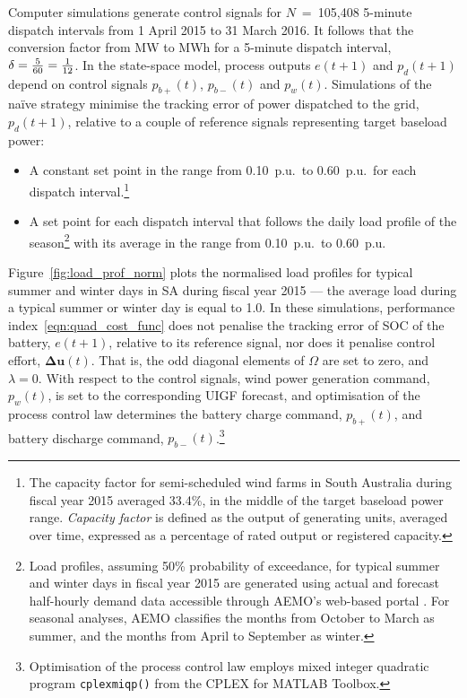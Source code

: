Computer simulations generate control signals for $N$~=~105,408 5-minute dispatch intervals from 1 April 2015 to 31 March 2016.  It follows that the conversion factor from MW to MWh for a 5-minute dispatch interval, $\delta = \tfrac{5}{60} = \tfrac{1}{12}$.  In the state-space model, process outputs $e(t\!+\!1)$ and $p_{d}(t\!+\!1)$ depend on control signals $p_{b+}(t)$, $p_{b-}(t)$ and $p_{w}(t)$.  Simulations of the na\"ive strategy minimise the tracking error of power dispatched to the grid, $p_{d}(t\!+\!1)$, relative to a couple of reference signals representing target baseload power:
\begin{itemize}
	\item  A constant set point in the range from 0.10~p.u.\ to 0.60~p.u.\ for each dispatch interval.\footnote{
The capacity factor for semi-scheduled wind farms in South Australia during fiscal year 2015 averaged 33.4\%, in the middle of the target baseload power range.  \textit{Capacity factor} is defined as the output of generating units, averaged over time,  expressed as a percentage of rated output or registered capacity.
}
	\item  A set point for each dispatch interval that follows the daily load profile of the season\footnote{
Load profiles, assuming 50\% probability of exceedance, for typical summer and winter days in fiscal year 2015 are generated using actual and forecast half-hourly demand data accessible through AEMO's web-based portal \citep{NEFR15b}.  For seasonal analyses, AEMO classifies the months from October to March as summer, and the months from April to September as winter.
} with its average in the range from 0.10~p.u.\ to 0.60~p.u.
\end{itemize}
Figure~\ref{fig:load_prof_norm} plots the normalised load profiles for typical summer and winter days in SA during fiscal year 2015 --- the average load during a typical summer or winter day is equal to 1.0.  In these simulations, performance index~\eqref{eqn:quad_cost_func} does not penalise the tracking error of SOC of the battery, $e(t\!+\!1)$, relative to its reference signal, nor does it penalise control effort, $\boldsymbol{\Delta{u}}(t)$.  That is, the odd diagonal elements of $\Omega$ are set to zero, and $\lambda = 0$.  With respect to the control signals, wind power generation command, $p_{w}(t)$, is set to the corresponding UIGF forecast, and optimisation of the process control law determines the battery charge command, $p_{b+}(t)$, and battery discharge command, $p_{b-}(t)$.\footnote{
Optimisation of the process control law employs mixed integer quadratic program \texttt{cplexmiqp()} from the CPLEX for MATLAB Toolbox.
}

